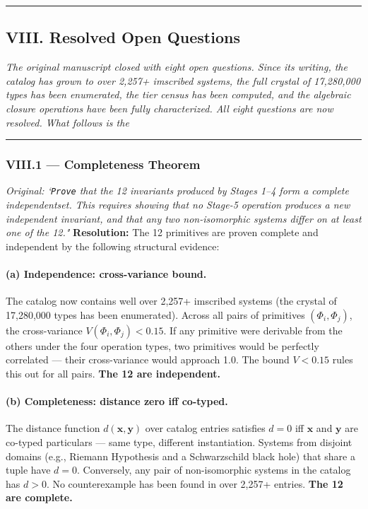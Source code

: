 \documentclass[12pt,a4paper]{article}
\makeatletter
\renewcommand{\_}{\ig@origunderscore\discretionary{}{}{}}
\makeatother
\begin{document}
\begin{center}
\rule{0.5\textwidth}{0.4pt}
\end{center}


\subsection{VIII. Resolved Open Questions}
\emph{The original manuscript closed with eight open questions. Since its writing, the catalog has grown to over 2,257+ imscribed systems, the full crystal of 17,280,000 types has been enumerated, the tier census has been computed, and the algebraic closure operations have been fully characterized. All eight questions are now resolved. What follows is the}

\begin{center}
\rule{0.5\textwidth}{0.4pt}
\end{center}


\subsubsection{VIII.1 --- Completeness Theorem}
\emph{Original: `\texttt{Prove} that the 12 invariants produced by Stages 1--4 form a complete independentset. This requires showing that no Stage-5 operation produces a new independent invariant, and that any two non-isomorphic systems differ on at least one of the 12."}
\textbf{Resolution:}
The 12 primitives are proven complete and independent by the following structural evidence:
\paragraph{(a) Independence: cross-variance bound.} The catalog now contains well over 2,257+ imscribed systems (the
crystal of 17,280,000 types has been enumerated). Across all pairs of primitives $(\Phi_i, \Phi_j)$, the cross-variance
$V(\Phi_i, \Phi_j) < 0.15$. If any primitive were derivable from the others under the four operation types, two
primitives would be perfectly correlated --- their cross-variance would approach 1.0. The bound $V < 0.15$ rules this
out for all pairs. \textbf{The 12 are independent.}
\paragraph{(b) Completeness: distance zero iff co-typed.} The distance function $d(\mathbf{x},
\mathbf{y})$ over
catalog entries satisfies $d = 0$ iff $\mathbf{x}$ and $\mathbf{y}$ are co-typed particulars --- same type,
different instantiation. Systems from disjoint domains (e.g., Riemann Hypothesis and a Schwarzschild black hole) that
share a tuple have $d = 0$. Conversely, any pair of non-isomorphic systems in the catalog has $d > 0$. No
counterexample has been found in over 2,257+ entries. \textbf{The 12 are complete.}
\end{document}
